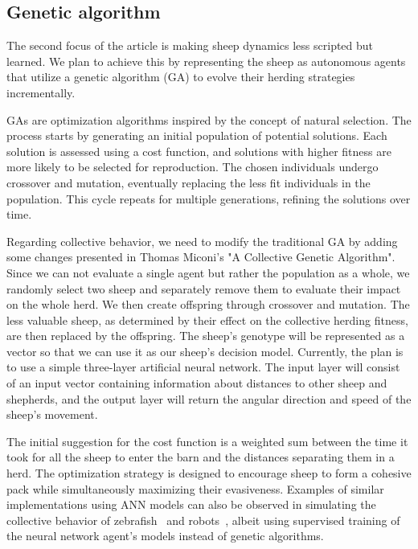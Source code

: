\documentclass[9pt]{pnas-new}
\begin{document}
\subsection{Genetic algorithm}
The second focus of the article is making sheep dynamics less scripted but learned. We plan to achieve this by representing the sheep as autonomous agents that utilize a genetic algorithm (GA) to evolve their herding strategies incrementally. 

GAs are optimization algorithms inspired by the concept of natural selection. The process starts by generating an initial population of potential solutions. Each solution is assessed using a cost function, and solutions with higher fitness are more likely to be selected for reproduction. The chosen individuals undergo crossover and mutation, eventually replacing the less fit individuals in the population. This cycle repeats for multiple generations, refining the solutions over time.

Regarding collective behavior, we need to modify the traditional GA by adding some changes presented in Thomas Miconi's "A Collective Genetic Algorithm"\cite{miconi2001collective}. Since we can not evaluate a single agent but rather the population as a whole, we randomly select two sheep and separately remove them to evaluate their impact on the whole herd. We then create offspring through crossover and mutation. The less valuable sheep, as determined by their effect on the collective herding fitness, are then replaced by the offspring. The sheep's genotype will be represented as a vector so that we can use it as our sheep's decision model. Currently, the plan is to use a simple three-layer artificial neural network. The input layer will consist of an input vector containing information about distances to other sheep and shepherds, and the output layer will return the angular direction and speed of the sheep's movement. 

The initial suggestion for the cost function is a weighted sum between the time it took for all the sheep to enter the barn and the distances separating them in a herd. The optimization strategy is designed to encourage sheep to form a cohesive pack while simultaneously maximizing their evasiveness. Examples of similar implementations using ANN models can also be observed in simulating the collective behavior of zebrafish~\cite{7496361} and robots~\cite{cazenille2018modelling}, albeit using supervised training of the neural network agent's models instead of genetic algorithms. 
\end{document}

